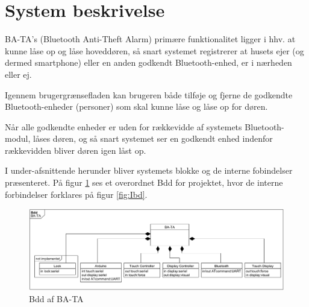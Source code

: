 \graphicspath{{Chapters/System/}}


\section{System beskrivelse}

BA-TA's (Bluetooth Anti-Theft Alarm) primære funktionalitet ligger i hhv. at kunne låse op og låse hoveddøren, så snart systemet registrerer at husets ejer (og dermed smartphone) eller en anden godkendt Bluetooth-enhed, er i nærheden eller ej.

Igennem brugergrænsefladen kan brugeren både tilføje og fjerne de godkendte Bluetooth-enheder (personer) som skal kunne låse og låse op for døren.

Når alle godkendte enheder er uden for rækkevidde af systemets Bluetooth-modul, låses døren, og så snart systemet ser en godkendt enhed indenfor rækkevidden bliver døren igen låst op. 

I under-afsnittende herunder bliver systemets blokke og de interne fobindelser præsenteret.
På figur \ref{fig:Bdd} ses et overordnet Bdd for projektet, hvor de interne forbindelser forklares på figur \ref{fig:Ibd}. 

\begin{figure}[H]
	\centering
	\includegraphics[width = 500 pt]{Img/Bdd.png}
	\caption{Bdd af BA-TA}
	\label{fig:Bdd}
\end{figure}

